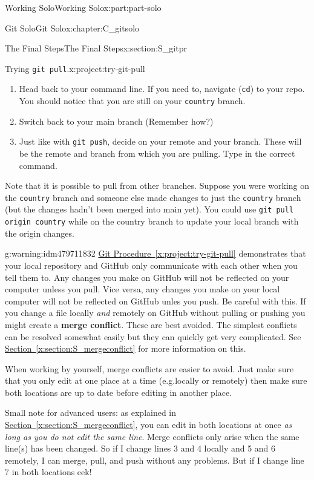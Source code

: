 \documentclass[oneside,10pt,]{book}
\newcommand{\xreffont}{\relax}
\newcommand{\mono}[1]{\texttt{#1}}
\newcommand{\terminology}[1]{\textbf{#1}}
\begin{document}
\begin{partptx}{Working Solo}{}{Working Solo}{}{}{x:part:part-solo}
\begin{chapterptx}{Git Solo}{}{Git Solo}{}{}{x:chapter:C_gitsolo}
\begin{sectionptx}{The Final Steps}{}{The Final Steps}{}{}{x:section:S_gitpr}
\begin{project}{Trying \mono{git pull}.}{x:project:try-git-pull}
\begin{enumerate}[font=\bfseries,label=(\alph*),ref=\alph*]
\item{}Head back to your command line. If you need to, navigate (\mono{cd}) to your repo. You should notice that you are still on your \mono{country} branch.%
\item{}Switch back to your main branch (Remember how?)%
\item{}Just like with \mono{git push}, decide on your remote and your branch. These will be the remote and branch from which you are pulling. Type in the correct command.%
\end{enumerate}
Note that it is possible to pull from other branches. Suppose you were working on the \mono{country} branch and someone else made changes to just the \mono{country} branch (but the changes hadn't been merged into main yet). You could use \mono{git pull origin country} while on the country branch to update your local branch with the origin changes.%
\end{project}%
\begin{warning}{}{g:warning:idm479711832}%
%
\hyperref[x:project:try-git-pull]{Git Procedure~{\xreffont\ref{x:project:try-git-pull}}} demonstrates that your local repository and GitHub only communicate with each other when you tell them to. Any changes you make on GitHub will not be reflected on your computer unless you pull. Vice versa, any changes you make on your local computer will not be reflected on GitHub unles you push. Be careful with this. If you change a file locally \emph{and} remotely on GitHub without pulling or pushing you might create a \terminology{merge conflict}. These are best avoided. The simplest conflicts can be resolved somewhat easily but they can quickly get very complicated. See \hyperref[x:section:S_mergeconflict]{Section~{\xreffont\ref{x:section:S_mergeconflict}}} for more information on this.%
\par
When working by yourself, merge conflicts are easier to avoid. Just make sure that you only edit at one place at a time (e.g.\@ locally or remotely) then make sure both locations are up to date before editing in another place.%
\par
Small note for advanced users: as explained in \hyperref[x:section:S_mergeconflict]{Section~{\xreffont\ref{x:section:S_mergeconflict}}}, you can edit in both locations at once \emph{as long as you do not edit the same line}. Merge conflicts only arise when the same line(s) has been changed. So if I change lines 3 and 4 locally and 5 and 6 remotely, I can merge, pull, and push without any problems. But if I change line 7 in both locations \textellipsis{} eek!%

\end{warning}
\end{sectionptx}
\end{chapterptx}
\end{partptx}
\end{document}
